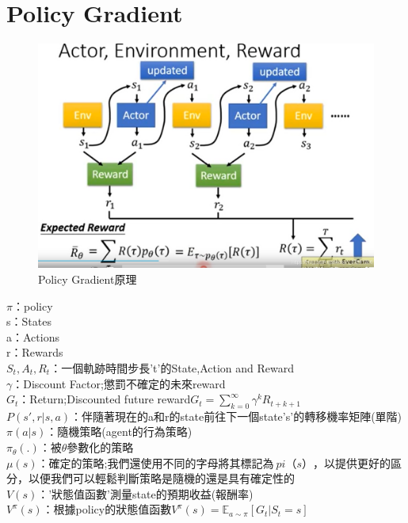 \documentclass[14pt,a4paper]{report}  %
\begin{document}
\section{Policy Gradient}
\begin{figure}[hbt!]
\begin{center}
\includegraphics[width=15cm]{policy gradient原理 }
\caption{\Large Policy Gradient原理}
\label{Policy Gradient原理}
\end{center}
\end{figure}
\hspace{-1.5em}$\pi$：policy\\
s：States\\
a：Actions\\
r：Rewards\\
$S_t,A_t,R_t$：一個軌跡時間步長't'的State,Action and Reward \\
$\gamma$：Discount Factor;懲罰不確定的未來reward\\
$G_t$：Return;Discounted future reward$G_t = \sum_{k=0}^{\infty} \gamma^k R_{t+k+1}$\\
$P(s', r \vert s, a)$：伴隨著現在的a和r的state前往下一個state's'的轉移機率矩陣(單階)\\
$\pi(a \vert s)$：隨機策略(agent的行為策略)\\
$\pi_\theta(.)$：被$\theta$參數化的策略\\
$\mu(s)$：確定的策略;我們還使用不同的字母將其標記為$ \ pi（s）$，以提供更好的區分，以便我們可以輕鬆判斷策略是隨機的還是具有確定性的\\
$V(s)$：'狀態值函數'測量state的預期收益(報酬率)\\
$V^\pi(s)$：根據policy的狀態值函數$V^\pi (s) = \mathbb{E}_{a\sim \pi} [G_t \vert S_t = s]$\\
\end{document}
